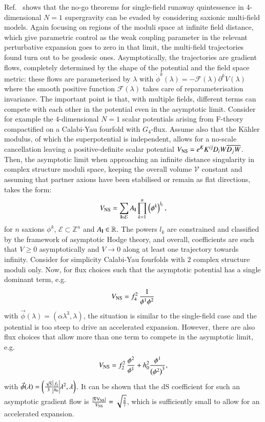 Ref.~\cite{Calderon-Infante:2022nxb} shows that the no-go theorems for single-field runaway quintessence in 4-dimensional $N=1$ supergravity can be evaded by considering saxionic multi-field models. Again focusing on regions of the moduli space at infinite field distance, which give parametric control as the weak coupling parameter in the relevant perturbative expansion goes to zero in that limit, the multi-field trajectories found turn out to be geodesic ones.  Asymptotically, the trajectories are gradient flows, completely determined by the shape of the potential and the field space metric: these flows are parameterised by $\lambda$ with $\dot{\phi}^k(\lambda) = -\mathcal{F}(\lambda)\partial^k V(\lambda)$ where the smooth positive function $\mathcal{F}(\lambda)$ takes care of reparameterisation invariance. The important point is that, with multiple fields, different terms can compete with each other in the potential even in the asymptotic limit. Consider for example the 4-dimensional $N=1$ scalar potentials arising from F-theory compactified on a Calabi-Yau fourfold with $G_4$-flux. Assume also that the K\"ahler modulus, of which the superpotential is independent, allows for a no-scale cancellation leaving a positive-definite scalar potential $V_{\rm NS} = e^K K^{i\bar{\jmath}}D_i W \overline{D_j W}$. Then, the asymptotic limit when approaching an infinite distance singularity in complex structure moduli space, keeping the overall volume $\mathcal{V}$ constant and assuming that partner axions have been stabilised or remain as flat directions, takes the form:
\begin{equation}
V_{\rm NS} = \sum_{\bf{l} \in \mathcal{E}} A_{\bf{l}} \prod_{k=1}^n \left(\phi^k\right)^{l_k},
\end{equation}
for $n$ saxions $\phi^k$, $\mathcal{E} \subset \mathbb{Z}^n$ and $A_{\bf{l}} \in \mathbb{R}$. The powers $l_k$ are constrained and classified by the framework of asymptotic Hodge theory, and overall, coefficients are such that $V\geq 0$ asymptotically and $V\rightarrow 0$ along at least one trajectory towards infinity. Consider for simplicity Calabi-Yau fourfolds with $2$ complex structure moduli only. Now, for flux choices such that the asymptotic potential has a single dominant term, e.g. 
\begin{equation}
V_{\rm NS}=f_4^2\,\frac{1}{\phi^1\phi^2}
\end{equation}
with $\vec{\phi}(\lambda)=(\alpha \lambda^3, \lambda)$, the situation is similar to the single-field case and the potential is too steep to drive an accelerated expansion. However, there are also flux choices that allow more than one term to compete in the asymptotic limit, e.g. 
\begin{equation}
V_{\rm NS} = f_2^2 \,\frac{\phi^2}{\phi^1}+h_0^2\frac{\phi^1}{\left(\phi^2\right)^3},
\end{equation}
with $\vec{\phi}(\lambda)=\left(\frac{\sqrt{5}}{3}\vline\frac{f_2}{h_0}\vline \lambda^2, \lambda\right)$. It can be shown that the dS coefficient for such an asymptotic gradient flow is $\frac{|\nabla V_{\rm NS}|}{V_{\rm NS}} = \sqrt{\frac27}$, which is sufficiently small to allow for an accelerated expansion.  


